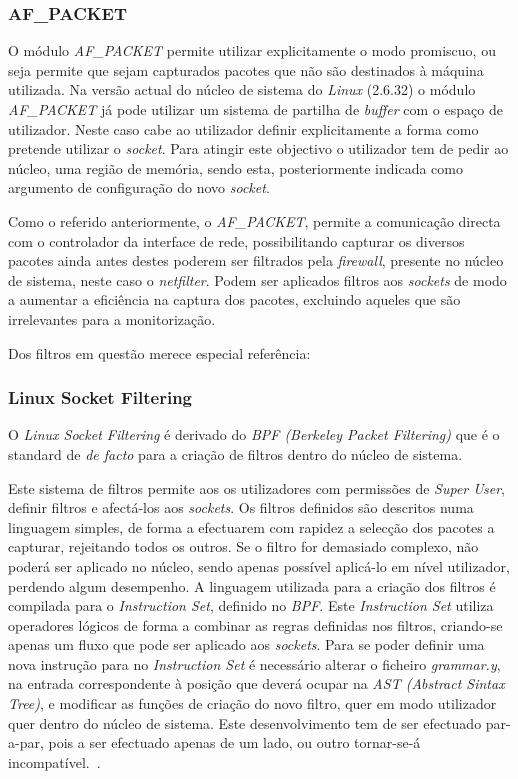 \subsubsection{AF\_PACKET}

O módulo \textit{AF\_PACKET} permite utilizar explicitamente o modo promiscuo, ou seja permite que sejam capturados pacotes que não são destinados à máquina utilizada.
Na versão actual do núcleo de sistema do \textit{Linux} (2.6.32) o módulo \textit{AF\_PACKET} já pode utilizar um sistema de partilha de \textit{buffer} com o espaço de utilizador.
Neste caso cabe ao utilizador definir explicitamente a forma como pretende utilizar o \textit{socket}. 
Para atingir este objectivo o utilizador tem de pedir ao núcleo, uma região de memória, sendo esta, posteriormente indicada como argumento de configuração do novo \textit{socket}.

Como o referido anteriormente, o \textit{AF\_PACKET}, permite a comunicação directa com o controlador da interface de rede, possibilitando capturar os diversos pacotes ainda antes destes poderem ser filtrados pela \textit{firewall}, presente no núcleo de sistema, neste caso o \textit{netfilter}.
Podem ser aplicados filtros aos \textit{sockets} de modo a aumentar a eficiência na captura dos pacotes, excluindo aqueles que são irrelevantes para a monitorização.

Dos filtros em questão merece especial referência:

\subsubsection{Linux Socket Filtering}
O \textit{Linux Socket Filtering} é derivado do \textit{BPF (Berkeley Packet Filtering)} que é o standard de \textit{de facto} para a criação de filtros dentro do núcleo de sistema. 

Este sistema de filtros permite aos os utilizadores com permissões de \textit{Super User}, definir filtros e afectá-los aos \textit{sockets}.
Os filtros definidos são descritos numa linguagem simples, de forma a efectuarem com rapidez a selecção dos pacotes a capturar, rejeitando todos os outros.
Se o filtro for demasiado complexo, não poderá ser aplicado no núcleo, sendo apenas possível aplicá-lo em nível utilizador, perdendo algum desempenho.
A linguagem utilizada para a criação dos filtros é compilada para o \textit{Instruction Set}, definido no \textit{BPF}.
Este \textit{Instruction Set} utiliza operadores lógicos de forma a combinar as regras definidas nos filtros, criando-se apenas um fluxo que pode ser aplicado aos \textit{sockets}.
Para se poder definir uma nova instrução para no \textit{Instruction Set} é necessário alterar o ficheiro \textit{grammar.y}, na entrada correspondente à posição que deverá ocupar na \textit{AST (Abstract Sintax Tree)}, e modificar as funções de criação do novo filtro, quer em modo utilizador quer dentro do núcleo de sistema.
Este desenvolvimento tem de ser efectuado par-a-par, pois a ser efectuado apenas de um lado, ou outro tornar-se-á incompatível.~\cite{Mccanne92thebsd}.

